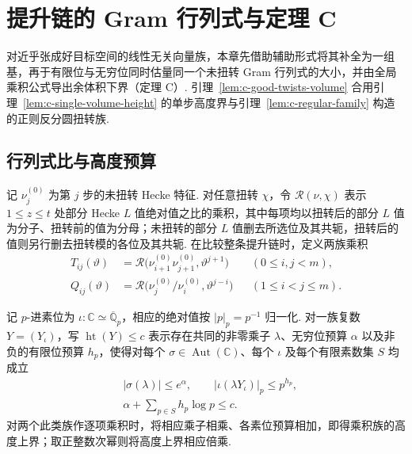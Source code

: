 \chapter{提升链的 Gram 行列式与定理 C}
\label{chap:determinant}

\begin{chapterguide}
对近乎张成好目标空间的线性无关向量族，本章先借助辅助形式将其补全为一组基，再于有限位与无穷位同时估量同一个未扭转 Gram 行列式的大小，并由全局乘积公式导出余体积下界（定理 C）. 引理~\ref{lem:c-good-twists-volume} 合用引理~\ref{lem:c-single-volume-height} 的单步高度界与引理~\ref{lem:c-regular-family} 构造的正则反分圆扭转族.
\end{chapterguide}

\section{行列式比与高度预算}
\label{sec:c-height}

记 $\nu_j^{(0)}$ 为第 $j$ 步的未扭转 Hecke 特征. 对任意扭转 $\chi$，令 $\mathcal R(\nu,\chi)$ 表示 $1\le z\le t$ 处部分 Hecke $L$ 值绝对值之比的乘积，其中每项均以扭转后的部分 $L$ 值为分子、扭转前的值为分母；未扭转的部分 $L$ 值删去所选位及其共轭，扭转后的值则另行删去扭转模的各位及其共轭. 在比较整条提升链时，定义两族乘积
\[
 \begin{aligned}
 T_{ij}(\vartheta)&=\mathcal R\bigl(\nu_{i+1}^{(0)}\nu_{j+1}^{(0)},\vartheta^{j+1}\bigr)
      &&(0\le i,j<m),\\
 Q_{ij}(\vartheta)&=\mathcal R\bigl(\nu_j^{(0)}/\nu_i^{(0)},\vartheta^{j-i}\bigr)
      &&(1\le i<j\le m).
 \end{aligned}
\]

记 $p$-进素位为 $\iota\colon\mathbb C\simeq\overline{\mathbb Q}_p$，相应的绝对值按 $|p|_p=p^{-1}$ 归一化. 对一族复数 $Y=(Y_\iota)$，写 $\operatorname{ht}(Y)\le c$ 表示存在共同的非零乘子 $\lambda$、无穷位预算 $\alpha$ 以及非负的有限位预算 $h_p$，使得对每个 $\sigma\in\operatorname{Aut}(\mathbb C)$、每个 $\iota$ 及每个有限素数集 $S$ 均成立
\begin{equation}\label{eq:height-budget}\begin{aligned}
 &|\sigma(\lambda)|\le e^\alpha,\qquad |\iota(\lambda Y_\iota)|_p\le p^{h_p},
\\
&\alpha+\sum_{p\in S} h_p\log p\le c.
\end{aligned}\end{equation}
对两个此类族作逐项乘积时，将相应乘子相乘、各素位预算相加，即得乘积族的高度上界；取正整数次幂则将高度上界相应倍乘.

